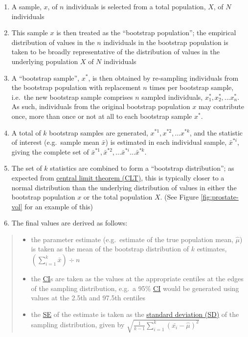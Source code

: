 \documentclass[
]{article}
\providecommand{\tightlist}{%
  \setlength{\itemsep}{0pt}\setlength{\parskip}{0pt}}
\begin{document}
\begin{enumerate}
\def\labelenumi{\arabic{enumi}.}
\tightlist
\item
  A sample, \(x\), of \(n\) individuals is selected from a total population, \(X\), of \(N\) individuals
\item
  This sample \(x\) is then treated as the ``bootstrap population''; the empirical distribution of values in the \(n\) individuals in the bootstrap population is taken to be broadly representative of the distribution of values in the underlying population \(X\) of \(N\) individuals
\item
  A ``bootstrap sample'', \(x^*\), is then obtained by re-sampling individuals from the bootstrap population with replacement \(n\) times per bootstrap sample, i.e.~the new bootstrap sample comprises \(n\) sampled individuals, \(x^*_1, x^*_2,...x^*_n\). As such, individuals from the original bootstrap population \(x\) may contribute once, more than once or not at all to each bootstrap sample \(x^*\).
\item
  A total of \(k\) bootstrap samples are generated, \(x^{*1}, x^{*2},...x^{*k}\), and the statistic of interest (e.g.~sample mean \(\bar{x}\)) is estimated in each individual sample, \(\bar{x}^{*i}\), giving the complete set of \(\bar{x}^{*1}, \bar{x}^{*2},...\bar{x}^{*i}...\bar{x}^{*k}\).
\item
  The set of \(k\) statistics are combined to form a ``bootstrap distribution''; as expected from \hyperref[acronyms_CLT]{central limit theorem (CLT)}\textsuperscript{}, this is typically closer to a normal distribution than the underlying distribution of values in either the bootstrap population \(x\) or the total population \(X\). (See Figure \ref{fig:prostate-vol} for an example of this)
\item
  The final values are derived as follows:
\end{enumerate}

\begin{quote}
\begin{itemize}
\tightlist
\item
  the parameter estimate (e.g.~estimate of the true population mean, \(\hat{\mu}\)) is taken as the mean of the bootstrap distribution of \(k\) estimates, \((\sum^k_{i = 1} \bar{x}) \div n\)
\item
  the \hyperref[acronyms_CI]{CI}s are taken as the values at the appropriate centiles at the edges of the sampling distribution, e.g.~a 95\% \hyperref[acronyms_CI]{CI} would be generated using values at the 2.5th and 97.5th centiles
\item
  the \hyperref[acronyms_SE]{SE} of the estimate is taken as the \hyperref[acronyms_SD]{standard deviation (SD)} of the sampling distribution, given by \(\sqrt{\frac{1}{k - 1} \sum^k_{i = 1} (\bar{x_i} - \hat{\mu})^2}\)
\end{itemize}
\end{quote}
\end{document}
